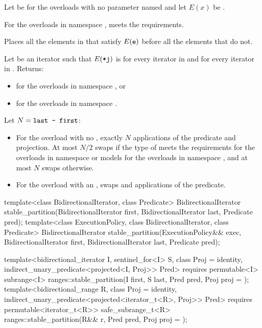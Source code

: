 \begin{itemdescr}
\pnum
Let  be 
for the overloads with no parameter named 
and let $E(x)$ be .

\pnum
\expects
For the overloads in namespace ,
 meets
the  requirements.

\pnum
\effects
Places all the elements  in 
that satisfy $E(\texttt{e})$ before all the elements that do not.

\pnum
\returns
Let  be an iterator such that $E(\texttt{*j})$ is
 for every iterator  in  and
 for every iterator  in .
Returns:
\begin{itemize}
\item {} for the overloads in namespace , or
\item {} for the overloads in namespace .
\end{itemize}


\pnum
\complexity
Let $N = \texttt{last - first}$:
\begin{itemize}
\item
  For the overload with no ,
  exactly $N$ applications of the predicate and projection.
  At most $N / 2$ swaps if the type of  meets
  the  requirements
  for the overloads in namespace  or
  models 
  for the overloads in namespace ,
  and at most $N$ swaps otherwise.
\item
  For the overload with an ,
   swaps and  applications of the predicate.
\end{itemize}

\end{itemdescr}

%
\begin{itemdecl}
template<class BidirectionalIterator, class Predicate>
  BidirectionalIterator
    stable_partition(BidirectionalIterator first, BidirectionalIterator last, Predicate pred);
template<class ExecutionPolicy, class BidirectionalIterator, class Predicate>
  BidirectionalIterator
    stable_partition(ExecutionPolicy&& exec,
                     BidirectionalIterator first, BidirectionalIterator last, Predicate pred);

template<bidirectional_iterator I, sentinel_for<I> S, class Proj = identity,
         indirect_unary_predicate<projected<I, Proj>> Pred>
  requires permutable<I>
  subrange<I> ranges::stable_partition(I first, S last, Pred pred, Proj proj = {});
template<bidirectional_range R, class Proj = identity,
         indirect_unary_predicate<projected<iterator_t<R>, Proj>> Pred>
  requires permutable<iterator_t<R>>
  safe_subrange_t<R> ranges::stable_partition(R&& r, Pred pred, Proj proj = {});
\end{itemdecl}

